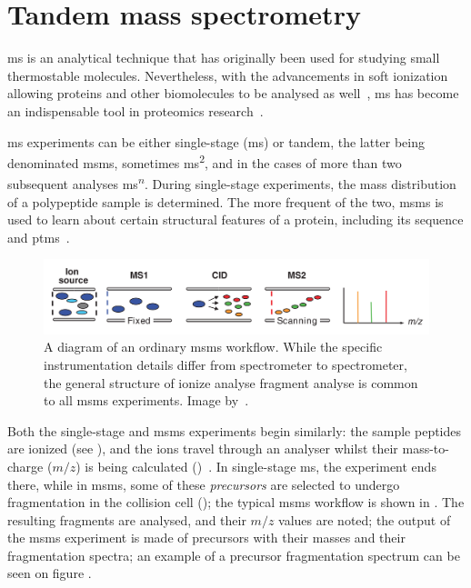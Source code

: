 \section{Tandem mass spectrometry}\label{sec:msms}

\Gls*{ms} is an analytical technique that has originally been used for studying small thermostable molecules. Nevertheless, with the advancements in soft ionization allowing proteins and other biomolecules to be analysed as well~\cite{fenn1989electrospray}, \gls*{ms} has become an indispensable tool in proteomics research~\cite{collins2003human}.

\Gls*{ms} experiments can be either single-stage (\gls*{ms}) or tandem, the latter being denominated \gls*{msms}, sometimes \gls*{ms}\textsuperscript{2}, and in the cases of more than two subsequent analyses \gls*{ms}\textsuperscript{\(n\)}. During single-stage experiments, the mass distribution of a polypeptide sample is determined. The more frequent of the two, \gls*{msms} is used to learn about certain structural features of a protein, including its sequence and \glspl*{ptm}~\cite{domon2006mass}.

\begin{figure}
  \centering
  \includegraphics[width=.9\linewidth]{img/msms-workflow.png}
  \caption{A diagram of an ordinary \gls*{msms} workflow. While the specific instrumentation details differ from spectrometer to spectrometer, the general structure of ionize \textrightarrow{} analyse \textrightarrow{} fragment \textrightarrow{} analyse is common to all \gls*{msms} experiments. Image by~\citet{domon2006mass}.}\label{fig:mass-spectrometry-workflow}
\end{figure}

Both the single-stage and \gls*{msms} experiments begin similarly: the sample peptides are ionized (see ), and the ions travel through an analyser whilst their mass-to-charge (\(m/z\)) is being calculated ()~\cite{gross2006mass}. In single-stage \gls*{ms}, the experiment ends there, while in \gls*{msms}, some of these \emph{precursors} are selected to undergo fragmentation in the collision cell (); the typical \gls*{msms} workflow is shown in . The resulting fragments are analysed, and their \(m/z\) values are noted; the output of the \gls*{msms} experiment is made of precursors with their masses and their fragmentation spectra; an example of a precursor fragmentation spectrum can be seen on figure .


